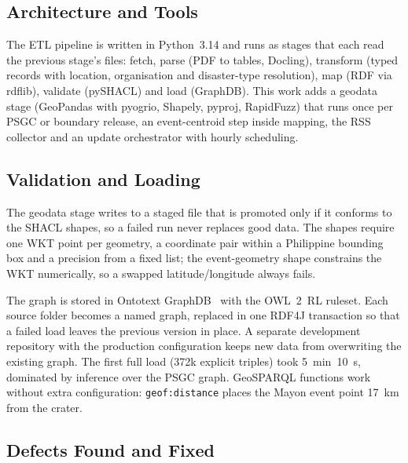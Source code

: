 \documentclass[acmtog]{acmart}
\begin{document}
\subsection{Architecture and Tools}

The ETL pipeline is written in Python~3.14 and runs as stages that each read the previous stage's
files: fetch, parse (PDF to tables, Docling), transform (typed records with location, organisation
and disaster-type resolution), map (RDF via rdflib), validate (pySHACL) and load (GraphDB). This
work adds a geodata stage (GeoPandas with pyogrio, Shapely, pyproj, RapidFuzz) that runs once per
PSGC or boundary release, an event-centroid step inside mapping, the RSS collector and an update
orchestrator with hourly scheduling.

\subsection{Validation and Loading}

The geodata stage writes to a staged file that is promoted only if it conforms to the SHACL
shapes, so a failed run never replaces good data. The shapes require one WKT point per geometry,
a coordinate pair within a Philippine bounding box and a precision from a fixed list; the
event-geometry shape constrains the WKT numerically, so a swapped latitude/longitude always fails.

The graph is stored in Ontotext GraphDB~\cite{ontotext2025graphdb} with the OWL~2~RL ruleset.
Each source folder becomes a named graph, replaced in one RDF4J transaction so that a failed load
leaves the previous version in place. A separate development repository with the production
configuration keeps new data from overwriting the existing graph. The first full load (372k
explicit triples) took 5~min~10~s, dominated by inference over the PSGC graph. GeoSPARQL
functions work without extra configuration: \texttt{geof:distance} places the Mayon event point
17~km from the crater.

\subsection{Defects Found and Fixed}
\end{document}
